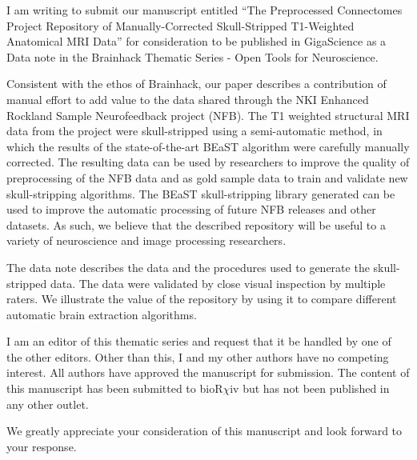 \documentclass{article}
\begin{document}
\sffamily

I am writing to submit our manuscript entitled ``The Preprocessed Connectomes Project Repository of Manually-Corrected Skull-Stripped T1-Weighted Anatomical MRI Data'' for consideration to be published in GigaScience as a Data note in the Brainhack Thematic Series - Open Tools for Neuroscience.

Consistent with the ethos of Brainhack, our paper describes a contribution of manual effort to add value to the data shared through the NKI Enhanced Rockland Sample Neurofeedback project (NFB). The T1 weighted structural MRI data from the project were skull-stripped using a semi-automatic method, in which the results of the state-of-the-art BEaST algorithm were carefully manually corrected. The resulting data can be used by researchers to improve the quality of preprocessing of the NFB data and as gold sample data to train and validate new skull-stripping algorithms. The BEaST skull-stripping library generated can be used to improve the automatic processing of future NFB releases and other datasets. As such, we believe that the described repository will be useful to a variety of neuroscience and image processing researchers.

The data note describes the data and the procedures used to generate the skull-stripped data. The data were validated by close visual inspection by multiple raters. We illustrate the value of the repository by using it to compare different automatic brain extraction algorithms. 

I am an editor of this thematic series and request that it be handled by one of the other editors. Other than this, I and my other authors have no competing interest. All authors have approved the manuscript for submission. The content of this manuscript has been submitted to bioR$\chi$iv but has not been published in any other outlet.

We greatly appreciate your consideration of this manuscript and look forward to your response.
\end{document}
